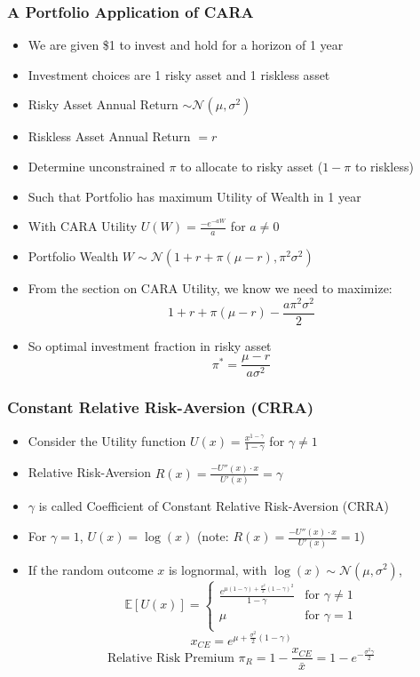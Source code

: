 \documentclass[handout]{beamer}
\begin{document}
\begin{frame}
\frametitle{A Portfolio Application of CARA}
\pause
\begin{itemize}[<+->]
\item We are given \$1 to invest and hold for a horizon of 1 year
\item Investment choices are 1 risky asset and 1 riskless asset
\item Risky Asset Annual Return $\sim \mathcal{N}(\mu, \sigma^2)$
\item Riskless Asset Annual Return $=r$
\item Determine unconstrained $\pi$ to allocate to risky asset ($1-\pi$ to riskless)
\item Such that Portfolio has maximum Utility of Wealth in 1 year
\item With CARA Utility $U(W) = \frac {-e^{-aW}} {a}$ for $a \neq 0$
\item Portfolio Wealth $W \sim \mathcal{N}(1+ r + \pi(\mu - r), \pi^2 \sigma^2)$
\item From the section on CARA Utility, we know we need to maximize:
$$1+r+\pi (\mu - r) - \frac {a \pi^2 \sigma^2} 2$$
\item So optimal investment fraction in risky asset
$$\pi^* = \frac {\mu - r} {a \sigma^2}$$
\end{itemize}
\end{frame}

\begin{frame}
\frametitle{Constant Relative Risk-Aversion (CRRA)}
\pause
\begin{itemize}[<+->]
\item Consider the Utility function $U(x) = \frac {x^{1 - \gamma}} {1 - \gamma}$ for $\gamma \neq 1$
\item Relative Risk-Aversion $R(x) = \frac {-U''(x) \cdot x} {U'(x)} = \gamma$
\item $\gamma$ is called Coefficient of Constant Relative Risk-Aversion (CRRA)
\item For $\gamma = 1$, $U(x) = \log(x)$ (note: $R(x) = \frac {-U''(x) \cdot x} {U'(x)} = 1$)
\item If the random outcome $x$ is lognormal, with $\log(x) \sim \mathcal{N}(\mu, \sigma^2)$,
$$
\mathbb{E}[U(x)] = 
\begin{cases}
\frac {e^{\mu (1 - \gamma) + \frac {\sigma^2} 2 (1-\gamma)^2}} {1 - \gamma} & \text{for } \gamma \neq 1\\
\mu & \text {for } \gamma = 1\\
\end{cases}
$$
$$x_{CE} = e^{\mu + \frac {\sigma^2} 2 (1- \gamma)}$$
$$\mbox{Relative Risk Premium } \pi_R = 1 - \frac {x_{CE}} {\bar{x}} =  1 - e^{-\frac {\sigma^2 \gamma} 2}$$
\end{itemize}
\end{frame}
\end{document}
